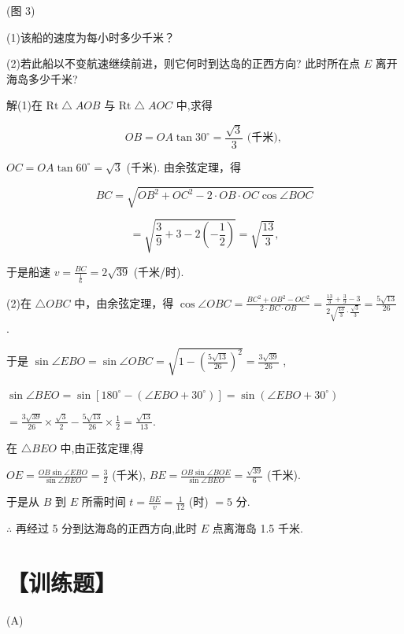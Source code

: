 \documentclass[10pt]{article}
\begin{document}
(图 3)

(1)该船的速度为每小时多少千米？

(2)若此船以不变航速继续前进，则它何时到达岛的正西方向? 此时所在点 \(E\) 离开海岛多少千米?

解(1)在 \(\mathrm{{Rt}}\bigtriangleup {AOB}\) 与 \(\mathrm{{Rt}}\bigtriangleup {AOC}\) 中,求得

\[
{OB} = {OA}\tan {30}^{ \circ  } = \frac{\sqrt{3}}{3}\text{ (千米), }
\]

\({OC} = {OA}\tan {60}^{ \circ  } = \sqrt{3}\) (千米). 由余弦定理，得

\[
{BC} = \sqrt{O{B}^{2} + O{C}^{2} - 2 \cdot  {OB} \cdot  {OC}\cos \angle {BOC}}
\]

\[
= \sqrt{\frac{3}{9} + 3 - 2\left( {-\frac{1}{2}}\right) } = \sqrt{\frac{13}{3}},
\]

于是船速 \(v = \frac{BC}{\frac{1}{6}} = 2\sqrt{39}\) (千米/时).

(2)在 \(\bigtriangleup {OBC}\) 中，由余弦定理，得 \(\cos \angle {OBC} = \frac{B{C}^{2} + O{B}^{2} - O{C}^{2}}{2 \cdot  {BC} \cdot  {OB}} = \frac{\frac{13}{3} + \frac{3}{9} - 3}{2\sqrt{\frac{13}{3}} \cdot  \frac{\sqrt{3}}{3}} = \frac{5\sqrt{13}}{26}\) .

于是 \(\sin \angle {EBO} = \sin \angle {OBC} = \sqrt{1 - {\left( \frac{5\sqrt{13}}{26}\right) }^{2}} = \frac{3\sqrt{39}}{26}\) ,

\(\sin \angle {BEO} = \sin \left\lbrack  {{180}^{ \circ  } - \left( {\angle {EBO} + {30}^{ \circ  }}\right) }\right\rbrack   = \sin \left( {\angle {EBO} + {30}^{ \circ  }}\right)\)

\(= \frac{3\sqrt{39}}{26} \times  \frac{\sqrt{3}}{2} - \frac{5\sqrt{13}}{26} \times  \frac{1}{2} = \frac{\sqrt{13}}{13}.\)

在 \(\bigtriangleup {BEO}\) 中,由正弦定理,得

\({OE} = \frac{{OB}\sin \angle {EBO}}{\sin \angle {BEO}} = \frac{3}{2}\) (千米), \({BE} = \frac{{OB}\sin \angle {BOE}}{\sin \angle {BEO}} = \frac{\sqrt{39}}{6}\) (千米).

于是从 \(B\) 到 \(E\) 所需时间 \(t = \frac{BE}{v} = \frac{1}{12}\) (时) \(= 5\) 分.

\(\therefore\) 再经过 5 分到达海岛的正西方向,此时 \(E\) 点离海岛 1.5 千米.

\section*{【训练题】}

(A)
\end{document}

